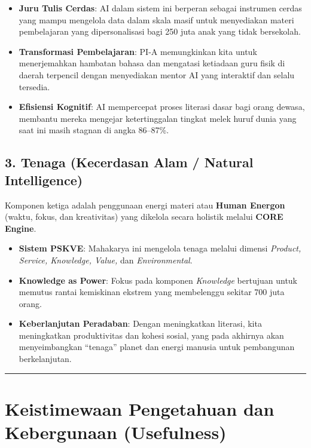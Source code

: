 \documentclass[
  letterpaper,
  DIV=11,
  numbers=noendperiod]{scrreprt}
\providecommand{\tightlist}{%
  \setlength{\itemsep}{0pt}\setlength{\parskip}{0pt}}
\begin{document}
\begin{itemize}
\tightlist
\item
  \textbf{Juru Tulis Cerdas}: AI dalam sistem ini berperan sebagai
  instrumen cerdas yang mampu mengelola data dalam skala masif untuk
  menyediakan materi pembelajaran yang dipersonalisasi bagi 250 juta
  anak yang tidak bersekolah.
\item
  \textbf{Transformasi Pembelajaran}: PI-A memungkinkan kita untuk
  menerjemahkan hambatan bahasa dan mengatasi ketiadaan guru fisik di
  daerah terpencil dengan menyediakan mentor AI yang interaktif dan
  selalu tersedia.
\item
  \textbf{Efisiensi Kognitif}: AI mempercepat proses literasi dasar bagi
  orang dewasa, membantu mereka mengejar ketertinggalan tingkat melek
  huruf dunia yang saat ini masih stagnan di angka 86--87\%.
\end{itemize}

\subsection{3. Tenaga (Kecerdasan Alam / Natural
Intelligence)}\label{tenaga-kecerdasan-alam-natural-intelligence}

Komponen ketiga adalah penggunaan energi materi atau \textbf{Human
Energon} (waktu, fokus, dan kreativitas) yang dikelola secara holistik
melalui \textbf{CORE Engine}.

\begin{itemize}
\tightlist
\item
  \textbf{Sistem PSKVE}: Mahakarya ini mengelola tenaga melalui dimensi
  \emph{Product, Service, Knowledge, Value,} dan \emph{Environmental}.
\item
  \textbf{Knowledge as Power}: Fokus pada komponen \emph{Knowledge}
  bertujuan untuk memutus rantai kemiskinan ekstrem yang membelenggu
  sekitar 700 juta orang.
\item
  \textbf{Keberlanjutan Peradaban}: Dengan meningkatkan literasi, kita
  meningkatkan produktivitas dan kohesi sosial, yang pada akhirnya akan
  menyeimbangkan ``tenaga'' planet dan energi manusia untuk pembangunan
  berkelanjutan.
\end{itemize}

\begin{center}\rule{0.5\linewidth}{0.5pt}\end{center}

\section{Keistimewaan Pengetahuan dan Kebergunaan
(Usefulness)}\label{keistimewaan-pengetahuan-dan-kebergunaan-usefulness}
\end{document}
